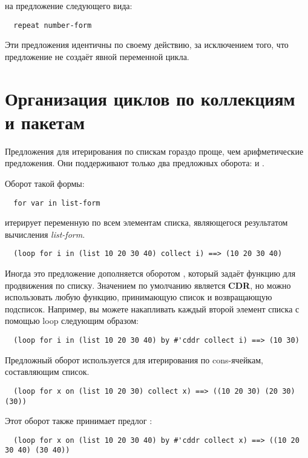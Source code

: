 на предложение  следующего вида:

\begin{lstlisting}
  repeat number-form
\end{lstlisting}

Эти предложения идентичны по своему действию, за исключением того, что предложение
 не создаёт явной переменной цикла.

\section{Организация циклов по коллекциям и пакетам}


Предложения  для итерирования по спискам гораздо проще, чем арифметические
предложения. Они поддерживают только два предложных оборота:  и .

Оборот такой формы:

\begin{lstlisting}
  for var in list-form
\end{lstlisting}

итерирует переменную по всем элементам списка, являющегося результатом вычисления
\textit{list-form}.

\begin{lstlisting}
  (loop for i in (list 10 20 30 40) collect i) ==> (10 20 30 40)
\end{lstlisting}

Иногда это предложение дополняется оборотом , который задаёт функцию для
продвижения по списку. Значением по умолчанию является \textbf{CDR}, но можно использовать
любую функцию, принимающую список и возвращающую подсписок. Например, вы можете
накапливать каждый второй элемент списка с помощью loop следующим образом:

\begin{lstlisting}
  (loop for i in (list 10 20 30 40) by #'cddr collect i) ==> (10 30)
\end{lstlisting}

Предложный оборот  используется для итерирования по cons-ячейкам, составляющим
список.

\begin{lstlisting}
  (loop for x on (list 10 20 30) collect x) ==> ((10 20 30) (20 30) (30))
\end{lstlisting}

Этот оборот также принимает предлог :

\begin{lstlisting}
  (loop for x on (list 10 20 30 40) by #'cddr collect x) ==> ((10 20 30 40) (30 40))
\end{lstlisting}

